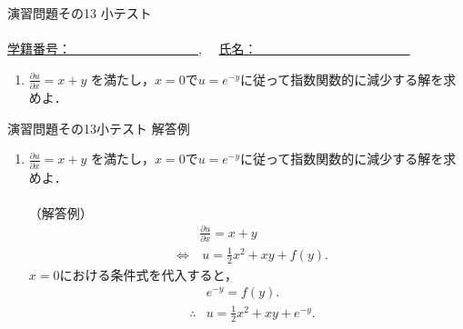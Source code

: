 \documentclass[11pt]{jsarticle}
\begin{document}
\begin{center}
{\Large 演習問題その13 小テスト
}\\
\ \\
\underline{学籍番号：　　　　　　　　　　},　
\underline{氏名：　　　　　　　　　　　　}
\end{center}
\begin{enumerate}
\item $\displaystyle{\frac{\partial u }{\partial x} = x+y}$
を満たし，$x=0$で$u=e^{-y}$に従って指数関数的に減少する解を求めよ．

\end{enumerate}







\newpage
\setcounter{page}{1}
\begin{center}
{\Large
演習問題その13小テスト 解答例}\\
\end{center}
\begin{enumerate}
\item $\displaystyle{\frac{\partial u }{\partial x} = x+y}$
を満たし，$x=0$で$u=e^{-y}$に従って指数関数的に減少する解を求めよ．\\
\\
（解答例）\\
\begin{eqnarray*}
&&\frac{\partial u }{\partial x} = x+y \\[5pt]
&\Leftrightarrow& \ u = \frac{1}{2}x^2 + xy + f(y).
\end{eqnarray*}
$x=0$における条件式を代入すると，
\begin{eqnarray*}
&& e^{-y} = f(y). \\[5pt]
&\therefore& u = \frac{1}{2}x^2+ xy + e^{-y}.
\end{eqnarray*}

\end{enumerate}
\end{document}
